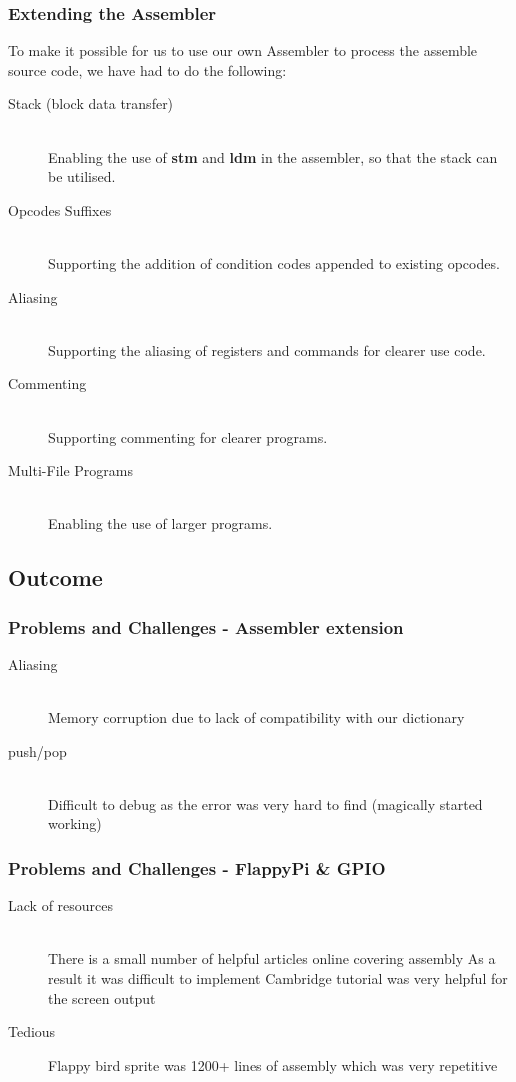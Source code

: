 \documentclass{beamer}
\begin{document}
\begin{frame}
\frametitle{Extending the Assembler}
To make it possible for us to use our own Assembler to process the assemble source code, we have had to do the following:
\begin{description}

\item[Stack (block data transfer)]\hfill\\
	\small Enabling the use of \textbf{stm} and \textbf{ldm} in the assembler, so that the stack can be utilised.
	
\item[Opcodes Suffixes]\hfill\\
	Supporting the addition of condition codes appended to existing opcodes.

\item[Aliasing]\hfill\\
	Supporting the aliasing of registers and commands for clearer use code.
		
\item[Commenting]\hfill\\
	Supporting commenting for clearer programs.

\item[Multi-File Programs]\hfill\\
	Enabling the use of larger programs.

\end{description}
\end{frame}
\subsection{Outcome}

\begin{frame}
\frametitle{Problems and Challenges - Assembler extension}
\begin{description}
\item[Aliasing]\hfill\\
	Memory corruption due to lack of compatibility with our dictionary
\item[push/pop]\hfill\\
	Difficult to debug as the error was very hard to find (magically started working)
\end{description}
\end{frame}

\begin{frame}
\frametitle{Problems and Challenges - FlappyPi & GPIO}
\begin{description}
\item[Lack of resources]\hfill\\
There is a small number of helpful articles online covering assembly
As a result it was difficult to implement
Cambridge tutorial was very helpful for the screen output
\item[Tedious]
Flappy bird sprite was 1200+ lines of assembly which was very repetitive

\end{description}
\end{frame}
\end{document}
